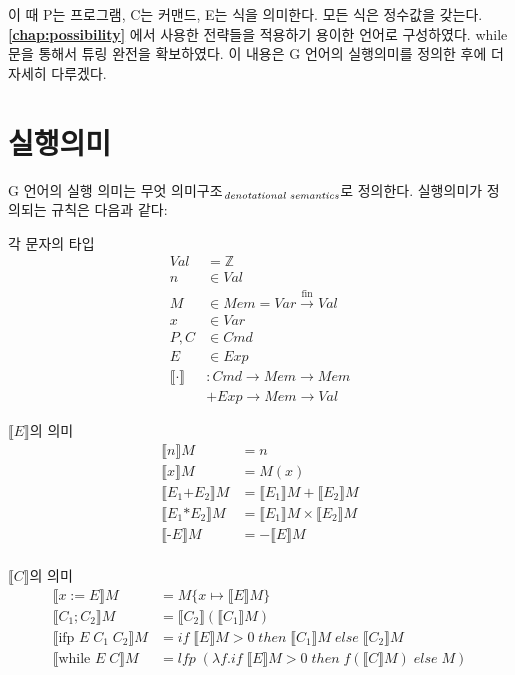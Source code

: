 \documentclass[ko]{snu-cse-bsc-thesis}
\newcommand{\alt}[2]{#1\textsubscript{\ensuremath{\text{\scriptsize\textit{#2}}}}}
\begin{document}
이 때 P는 프로그램, C는 커맨드, E는 식을 의미한다. 모든 식은 정수값을 갖는다.
\textbf{\eqref{chap:possibility} } 에서 사용한 전략들을 적용하기 용이한 언어로 구성하였다. 
while 문을 통해서 튜링 완전을 확보하였다. 이 내용은 G 언어의 실행의미를 정의한 후에 더 자세히 다루겠다.

\section{실행의미}\label{sec:semantics}
G 언어의 실행 의미는 \alt{무엇 의미구조}{denotational semantics}로 정의한다. 실행의미가 정의되는 규칙은 다음과 같다:


각 문자의 타입
\begin{align*}
  Val &= \mathbb{Z} \\
  n &\in Val \\
  M &\in Mem = Var \xrightarrow{\text{fin}} Val \\
  x &\in Var \\
  P, C &\in Cmd \\
  E &\in Exp \\
  \llbracket \cdot \rrbracket &: Cmd \rightarrow Mem \rightarrow Mem \\
  &+ Exp \rightarrow Mem \rightarrow Val
\end{align*}

$\llbracket E \rrbracket$의 의미
\begin{align*}
     \llbracket n \rrbracket M &= n \\
     \llbracket x \rrbracket M &= M(x) \\
     \llbracket E_1 \text{+} E_2 \rrbracket M &= \llbracket E_1 \rrbracket M + \llbracket E_2 \rrbracket M \\
     \llbracket E_1 \text{*} E_2 \rrbracket M &= \llbracket E_1 \rrbracket M \times \llbracket E_2 \rrbracket M \\
     \llbracket \text{-} E \rrbracket M &= - \llbracket E \rrbracket M\\
\end{align*}

$\llbracket C \rrbracket$의 의미
\begin{align*}
     \llbracket x := E \rrbracket M &= M\{x \mapsto \llbracket E \rrbracket M\} \\
     \llbracket C_1 ; C_2 \rrbracket M &= \llbracket C_2 \rrbracket (\llbracket C_1 \rrbracket M)  \\
     \llbracket \text{ifp } E \; C_1 \; C_2 \rrbracket M &= if \; \llbracket E \rrbracket M > 0 \; then \; \llbracket C_1 \rrbracket M \; else \; \llbracket C_2 \rrbracket M \\
     \llbracket \text{while } E \; C \rrbracket M &= lfp \; (\lambda f.if \; \llbracket E \rrbracket M > 0 \; then \; f(\llbracket C \rrbracket M) \; else \; M)
\end{align*}
\end{document}
